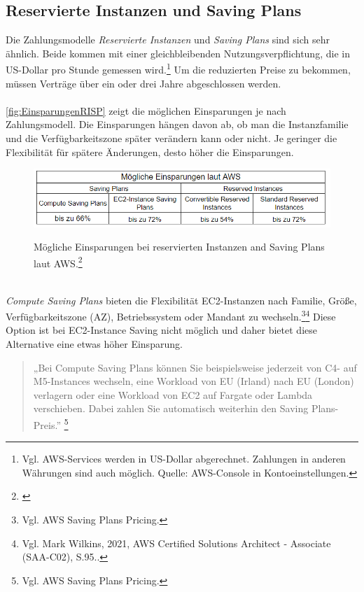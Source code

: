 \subsection{Reservierte Instanzen und Saving Plans}
Die Zahlungsmodelle \textit{Reservierte Instanzen} und \textit{Saving Plans} sind sich sehr ähnlich. Beide kommen mit einer gleichbleibenden  Nutzungsverpflichtung, die in US-Dollar pro Stunde gemessen wird.\footnote{Vgl. AWS-Services werden in US-Dollar abgerechnet. Zahlungen in anderen Währungen sind auch möglich. Quelle: AWS-Console in Kontoeinstellungen.} Um die reduzierten Preise  zu bekommen, müssen Verträge über ein oder drei Jahre abgeschlossen werden. 
\\\\
\autoref{fig:EinsparungenRISP} zeigt die möglichen Einsparungen je nach Zahlungsmodell. Die Einsparungen hängen davon ab, ob man die Instanzfamilie und die Verfügbarkeitszone später verändern kann oder nicht. Je geringer die Flexibilität für spätere Änderungen, desto höher die Einsparungen.
\begin{figure}[h!]
  \centering
  \includegraphics[scale=0.8]{sources/EinsparungenRISP}\label{fig:EinsparungenRISP}\\
  \caption[Mögliche Einsparungen bei reservierten Instanzen and Saving Plans laut AWS]{}
  \label{fig:EinsparungenRISP}
  Mögliche Einsparungen bei reservierten Instanzen and Saving Plans laut AWS.\footnote{\cite{AMZ07,AMZ11}}
\end{figure}
\\
\textit{Compute Saving Plans} bieten die Flexibilität EC2-Instanzen nach Familie, Größe, Verfügbarkeitszone (AZ), Betriebssystem oder Mandant zu wechseln.\footnote{Vgl. AWS Saving Plans Pricing\cite{AMZ11}.}\footnote{Vgl. Mark Wilkins, 2021, AWS Certified Solutions Architect - Associate (SAA-C02), S.95.\cite{AWS1}.} Diese Option ist bei EC2-Instance Saving nicht möglich und daher bietet diese Alternative eine etwas höher Einsparung.
\begin{quote}
    „Bei Compute Saving Plans können Sie beispielsweise jederzeit von C4- auf M5-Instances wechseln, eine Workload von EU (Irland) nach EU (London) verlagern oder eine Workload von EC2 auf Fargate oder Lambda verschieben. Dabei zahlen Sie automatisch weiterhin den Saving Plans-Preis.”
    \footnote{Vgl. AWS Saving Plans Pricing\cite{AMZ11}.}
\end{quote}
